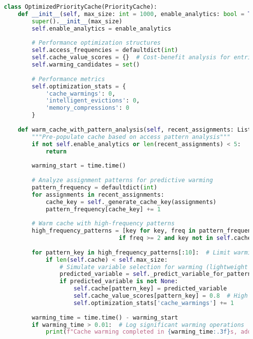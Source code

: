 \begin{lstlisting}[language=Python, caption=Advanced Cache Optimization Strategies]
class OptimizedPriorityCache(PriorityCache):
    def __init__(self, max_size: int = 1000, enable_analytics: bool = True):
        super().__init__(max_size)
        self.enable_analytics = enable_analytics
        
        # Performance optimization structures
        self.access_frequencies = defaultdict(int)
        self.cache_value_scores = {}  # Cost-benefit analysis for entries
        self.warming_candidates = set()
        
        # Performance metrics
        self.optimization_stats = {
            'cache_warmings': 0,
            'intelligent_evictions': 0,
            'memory_compressions': 0
        }
    
    def warm_cache_with_pattern_analysis(self, recent_assignments: List[Dict[int, bool]]):
        """Pre-populate cache based on access pattern analysis"""
        if not self.enable_analytics or len(recent_assignments) < 5:
            return
        
        warming_start = time.time()
        
        # Analyze assignment patterns for predictive warming
        pattern_frequency = defaultdict(int)
        for assignments in recent_assignments:
            cache_key = self._generate_cache_key(assignments)
            pattern_frequency[cache_key] += 1
        
        # Warm cache with high-frequency patterns
        high_frequency_patterns = [key for key, freq in pattern_frequency.items() 
                                 if freq >= 2 and key not in self.cache]
        
        for pattern_key in high_frequency_patterns[:10]:  # Limit warming overhead
            if len(self.cache) < self.max_size:
                # Simulate variable selection for warming (lightweight computation)
                predicted_variable = self._predict_variable_for_pattern(pattern_key)
                if predicted_variable is not None:
                    self.cache[pattern_key] = predicted_variable
                    self.cache_value_scores[pattern_key] = 0.8  # High initial value
                    self.optimization_stats['cache_warmings'] += 1
        
        warming_time = time.time() - warming_start
        if warming_time > 0.01:  # Log significant warming operations
            print(f"Cache warming completed in {warming_time:.3f}s, added {len(high_frequency_patterns)} entries")
    

\end{lstlisting}
